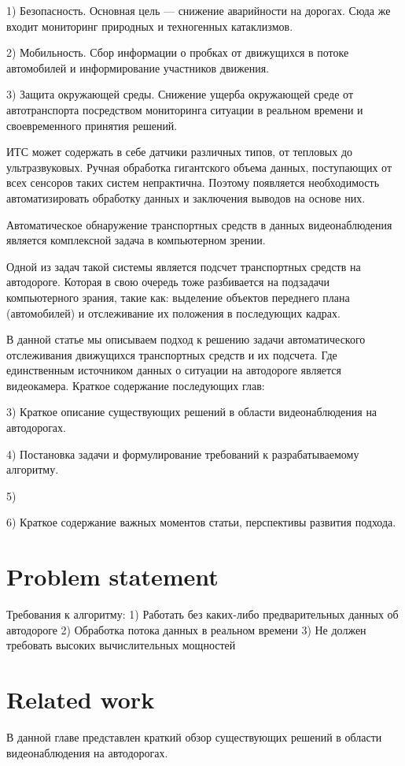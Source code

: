 \documentclass[12pt,a4paper,oneside,titlepage]{article}
\begin{document}
1) Безопасность. Основная цель — снижение аварийности на дорогах. Сюда же входит мониторинг природных и техногенных катаклизмов.

2) Мобильность. Сбор информации о пробках от движущихся в потоке автомобилей и информирование участников движения.

3) Защита окружающей среды. Снижение ущерба окружающей среде от автотранспорта посредством мониторинга ситуации в реальном времени и своевременного принятия решений.

ИТС может содержать в себе датчики различных типов, от тепловых до ультразвуковых.
Ручная обработка гигантского объема данных, поступающих от всех сенсоров таких систем непрактична.
Поэтому появляется необходимость автоматизировать обработку данных и заключения выводов на основе них.

Автоматическое обнаружение транспортных средств в данных видеонаблюдения является комплексной задача в компьютерном зрении.

Одной из задач такой системы является подсчет транспортных средств на автодороге.
Которая в свою очередь тоже разбивается на подзадачи компьютерного зрания, такие как: выделение объектов переднего плана (автомобилей) и отслеживание их положения в последующих кадрах.


В данной статье мы описываем подход к решению задачи автоматического отслеживания движущихся транспортных средств и их подсчета.
Где единственным источником данных о ситуации на автодороге является видеокамера. 
Краткое содержание последующих глав:

3) Краткое описание существующих решений в области видеонаблюдения на автодорогах.

4) Постановка задачи и формулирование требований к разрабатываемому алгоритму.

5) 

6) Краткое содержание важных моментов статьи, перспективы развития подхода.

\newpage
\section*{Problem statement}
Требования к алгоритму:
1) Работать без каких-либо предварительных данных об автодороге
2) Обработка потока данных в реальном времени
3) Не должен требовать высоких вычислительных мощностей


\newpage
\section*{Related work}
В данной главе представлен краткий обзор существующих решений в области видеонаблюдения на автодорогах.
\end{document}
